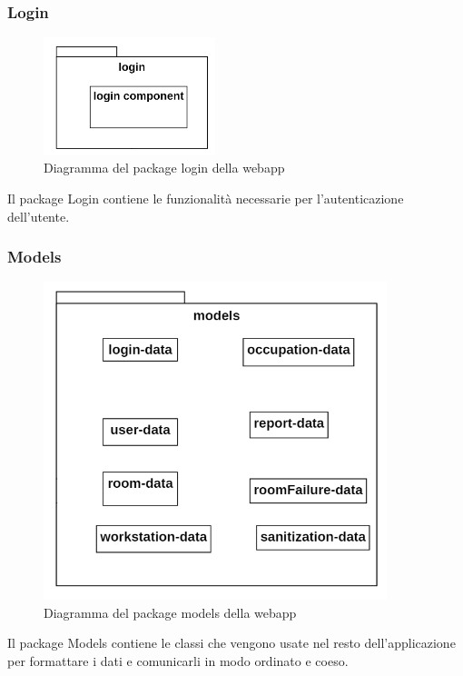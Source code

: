 \subsubsection{Login}
\begin{figure}[H]
	\centering
	\includegraphics[width=5cm]{res/images/webapp-login-diagrammaPackage.png}
	\caption{Diagramma del package login della webapp}
	\label{fig:DiagrammaPackageLoginWebapp}
\end{figure}
Il package Login contiene le funzionalità necessarie per l'autenticazione dell'utente.

\subsubsection{Models}
\begin{figure}[H]
	\centering
	\includegraphics[width=10cm]{res/images/webapp-models-diagrammaPackage.png}
	\caption{Diagramma del package models della webapp}
	\label{fig:DiagrammaPackageModelsWebapp}
\end{figure}
Il package Models contiene le classi che vengono usate nel resto dell'applicazione per formattare i dati e comunicarli in modo ordinato e coeso.

